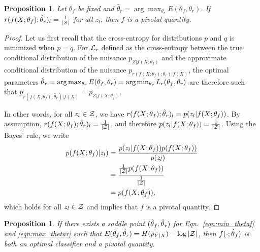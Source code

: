\documentclass{article}
\theoremstyle{plain}
\newtheorem{proposition}[theorem]{Proposition}
\begin{document}
\begin{proposition}\label{prop:1}
Let $\theta_f$ be fixed and $\hat\theta_r = \arg \max_{\theta_r} E(\theta_f,
\theta_r)$. If $r(f(X;\theta_f) ; \hat\theta_r )_l = \frac{1}{|{\cal Z}|}$
for all $z_l$, then $f$ is a pivotal quantity.
\end{proposition}

\begin{proof}
Let us first recall that the cross-entropy for distributions $p$ and $q$ is
minimized when $p=q$. For ${\cal L}_r$ defined as the cross-entropy between the
true conditional distribution of the nuisance $p_{Z|f(X;\theta_f)}$ and
the approximate conditional distribution of the nuisance
$p_{r(f(X;\theta_f);\theta_r)|f(X)}$, the optimal parameters $\smash{\hat\theta}_r =
\arg \max_{\theta_r} E(\theta_f, \theta_r) = \arg \min_{\theta_r} L_r(\theta_f,
\theta_r)$ are therefore such that $p_{r(f(X;\theta_f);\hat\theta_r)|f(X)} = p_{Z|f(X;\theta_f)}$.

In other words, for all $z_l \in {\cal Z}$, we have $r(f(X;\theta_f);\smash{\hat\theta}_r)_l = p(z_l|f(X;\theta_f))$.
By assumption, $r(f(X;\theta_f);\smash{\hat\theta}_r)_l = \frac{1}{|{\cal Z}|}$,
and therefore $p(z_l|f(X;\theta_f)) = \frac{1}{|{\cal Z}|}$.
Using the Bayes' rule, we write
\begin{align*}
    p(f(X;\theta_f)|z_l) &= \frac{ p(z_l|f(X;\theta_f)) p(f(X;\theta_f)) } { p(z_l)} \\
                         &= \frac{ \tfrac{1}{|{\cal Z}|} p(f(X;\theta_f)) } { \tfrac{1}{|{\cal Z}|} } \\
                         &= p(f(X;\theta_f)),
\end{align*}
which holds for all $z_l \in {\cal Z}$ and implies that $f$ is a pivotal quantity.
\end{proof}

\begin{proposition}\label{prop:2}
If there exists a saddle point $(\smash{\hat\theta}_f, \smash{\hat\theta}_r)$
for Eqn.~\ref{eqn:min_thetaf} and \ref{eqn:max_thetar} such that
$E(\hat\theta_f, \hat\theta_r) = H(p_{Y|X}) - \log |{\cal Z}|$, then
$f(\cdot;\smash{\hat\theta}_f)$ is both an optimal classifier  and a pivotal quantity.
\end{proposition}
\end{document}
